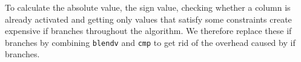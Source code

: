 To calculate the absolute value, the sign value, checking whether a column is already activated and getting only values that satisfy some constraints create expensive if branches throughout the algorithm.
We therefore replace these if branches by combining \texttt{blendv} and \texttt{cmp} to get rid of the overhead caused by if branches.












